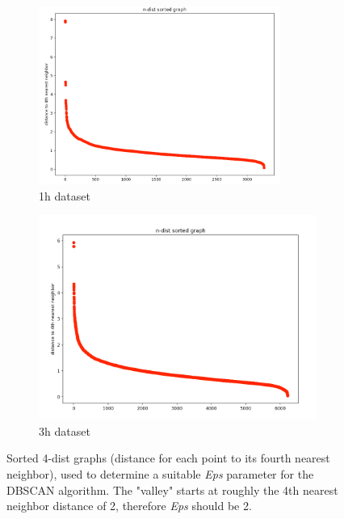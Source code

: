 \begin{figure}[H]
  \centering
  \begin{subfigure}{.5\textwidth}
    \centering
    \includegraphics[width=0.87\textwidth]{./images/kDistGraphDBSCAN1h.png}
  \caption{1h dataset}
  \label{figure:kDistGraphDBSCAN1h}
  \end{subfigure}%
  \hfill
  \begin{subfigure}{.5\textwidth}
    \centering
    \includegraphics[width=1\textwidth]{./images/kDistGraphDBSCAN3h.png}
    \caption{3h dataset}
    \label{figure:kDistGraphDBSCAN3h}
  \end{subfigure}
  \caption{Sorted 4-dist graphs (distance for each point to its fourth nearest neighbor), used to determine a suitable \textit{Eps} parameter for the DBSCAN algorithm. The "valley" starts at roughly the 4th nearest neighbor distance of 2, therefore \textit{Eps} should be 2.}
  \label{figure:kDistGraphDBSCAN}
  \end{figure}

